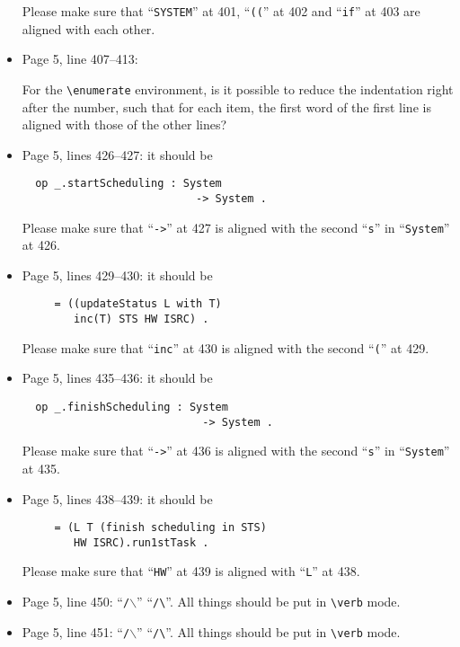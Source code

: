 \documentclass[12pt,onecolumn]{IEEEtranTIE}
\begin{document}
\begin{itemize}
Please make sure that ``\verb|SYSTEM|'' at 401, ``\verb|((|'' at 402
and ``\verb|if|'' at 403 are aligned with each other.


\item Page 5, line 407--413:

For the \verb|\enumerate| environment, is it possible to reduce the
indentation right after the number, such that for each item, the first
word of the first line is aligned with those of the other lines? 


\item Page 5, lines 426--427: it should be
\begin{verbatim}
  op _.startScheduling : System 
                           -> System .
\end{verbatim}

Please make sure that ``\verb|->|'' at 427 is aligned with the second
``\verb|s|'' in ``\verb|System|'' at 426.


\item Page 5, lines 429--430: it should be
\begin{verbatim}
     = ((updateStatus L with T) 
        inc(T) STS HW ISRC) .
\end{verbatim}

Please make sure that ``\verb|inc|'' at 430 is aligned with the second
``\verb|(|'' at 429.


\item Page 5, lines 435--436: it should be
\begin{verbatim}
  op _.finishScheduling : System 
                            -> System .
\end{verbatim}

Please make sure that ``\verb|->|'' at 436 is aligned with the second
``\verb|s|'' in ``\verb|System|'' at 435.


\item Page 5, lines 438--439: it should be
\begin{verbatim}
     = (L T (finish scheduling in STS) 
        HW ISRC).run1stTask .
\end{verbatim}

Please make sure that ``\verb|HW|'' at 439 is aligned with
``\verb|L|'' at 438.


\item Page 5, line 450: ``\verb|/|$\backslash$'' \by
  ``\verb|/\|''. All things should be put in \verb|\verb| mode.

\item Page 5, line 451: ``\verb|/|$\backslash$'' \by
  ``\verb|/\|''. All things should be put in \verb|\verb| mode.


\end{itemize}
\end{document}
